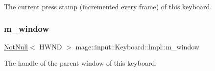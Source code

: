 The current press stamp (incremented every frame) of this keyboard. \mbox{\label{classmage_1_1input_1_1_keyboard_1_1_impl_a55d12479108b554c1139bad8318994db}} 
\subsubsection{\texorpdfstring{m\+\_\+window}{m\_window}}
{\footnotesize\ttfamily \mbox{\hyperlink{namespacemage_a8769f9d670d6b585ea306cb1062af94b}{Not\+Null}}$<$ H\+W\+ND $>$ mage\+::input\+::\+Keyboard\+::\+Impl\+::m\+\_\+window\hspace{0.3cm}{\ttfamily [private]}}

The handle of the parent window of this keyboard. 